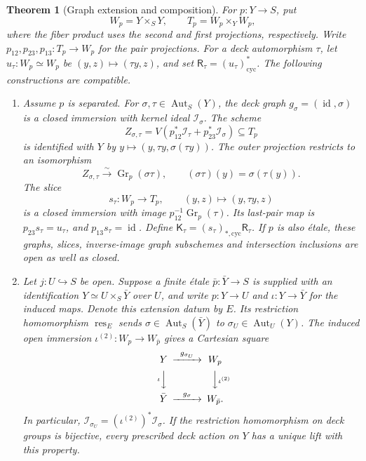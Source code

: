 \documentclass[11pt]{article}
\newtheorem{theorem}{Theorem}[section]
\theoremstyle{definition}
\theoremstyle{remark}
\begin{document}
\begin{theorem}[Graph extension and composition]
\label{thm:graph-extension-composition}
For \(p:Y\to S\), put
\[
  W_p=Y\times_S Y,\qquad
  T_p=W_p\times_Y W_p,
\]
where the fiber product uses the second and first projections,
respectively. Write \(p_{12},p_{23},p_{13}:T_p\to W_p\) for the
pair projections. For a deck automorphism \(\tau\), let
\(u_\tau:W_p\simeq W_p\) be \((y,z)\mapsto(\tau y,z)\), and set
\(\mathsf R_\tau=(u_\tau)^*_{\mathrm{cyc}}\).
The following constructions are compatible.

\begin{enumerate}[label=\textup{(\roman*)},leftmargin=*]
\item
Assume \(p\) is separated. For
\(\sigma,\tau\in\operatorname{Aut}_S(Y)\), the deck graph
\(g_\sigma=(\operatorname{id},\sigma)\) is a closed immersion with
kernel ideal \(\mathcal I_\sigma\). The scheme
\[
  Z_{\sigma,\tau}
   =V\!\left(p_{12}^*\mathcal I_\tau+
                   p_{23}^*\mathcal I_\sigma\right)\subseteq T_p
\]
is identified with \(Y\) by
\(y\mapsto(y,\tau y,\sigma(\tau y))\).
The outer projection restricts to an isomorphism
\[
  Z_{\sigma,\tau}\xrightarrow{\sim}
      \operatorname{Gr}_p(\sigma\tau),
  \qquad (\sigma\tau)(y)=\sigma(\tau(y)).
\]
The slice
\[
  s_\tau:W_p\longrightarrow T_p,\qquad
  (y,z)\longmapsto(y,\tau y,z)
\]
is a closed immersion with image
\(p_{12}^{-1}\operatorname{Gr}_p(\tau)\).
Its last-pair map is \(p_{23}s_\tau=u_\tau\), and
\(p_{13}s_\tau=\operatorname{id}\). Define
\(\mathsf K_\tau=(s_\tau)_{*,\mathrm{cyc}}\mathsf R_\tau\).
If \(p\) is also \'etale, these graphs, slices, inverse-image graph
subschemes and intersection inclusions are open as well as closed.

\item
Let \(j:U\hookrightarrow S\) be open. Suppose a finite \'etale
\(\bar p:\bar Y\to S\) is supplied with an identification
\(Y\simeq U\times_S\bar Y\) over \(U\), and write \(p:Y\to U\)
and \(\iota:Y\to\bar Y\) for the induced maps.
Denote this extension datum by \(E\). Its restriction homomorphism
\(\operatorname{res}_E\) sends
\(\sigma\in\operatorname{Aut}_S(\bar Y)\) to
\(\sigma_U\in\operatorname{Aut}_U(Y)\).
The induced open immersion
\(\iota^{(2)}:W_p\to W_{\bar p}\) gives a Cartesian square
\[
\begin{CD}
Y @>{g_{\sigma_U}}>> W_p\\
@V{\iota}VV @VV{\iota^{(2)}}V\\
\bar Y @>{g_\sigma}>> W_{\bar p}.
\end{CD}
\]
In particular,
\(\mathcal I_{\sigma_U}=(\iota^{(2)})^*\mathcal I_\sigma\).
If the restriction homomorphism on deck groups is bijective, every
prescribed deck action on \(Y\) has a unique lift with this property.


\end{enumerate}
\end{theorem}
\end{document}
